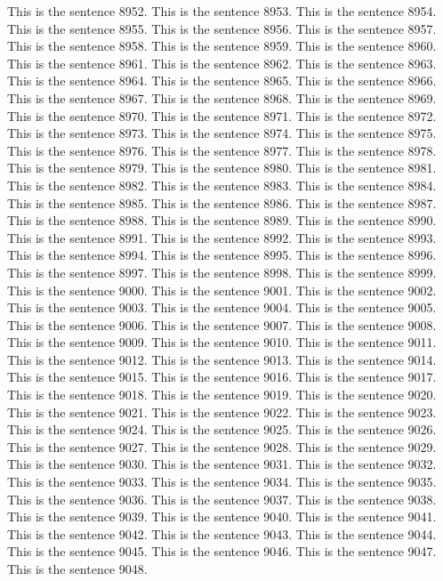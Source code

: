 \documentclass{article}
\begin{document}
This is the sentence 8952.
This is the sentence 8953.
This is the sentence 8954.
This is the sentence 8955.
This is the sentence 8956.
This is the sentence 8957.
This is the sentence 8958.
This is the sentence 8959.
This is the sentence 8960.
This is the sentence 8961.
This is the sentence 8962.
This is the sentence 8963.
This is the sentence 8964.
This is the sentence 8965.
This is the sentence 8966.
This is the sentence 8967.
This is the sentence 8968.
This is the sentence 8969.
This is the sentence 8970.
This is the sentence 8971.
This is the sentence 8972.
This is the sentence 8973.
This is the sentence 8974.
This is the sentence 8975.
This is the sentence 8976.
This is the sentence 8977.
This is the sentence 8978.
This is the sentence 8979.
This is the sentence 8980.
This is the sentence 8981.
This is the sentence 8982.
This is the sentence 8983.
This is the sentence 8984.
This is the sentence 8985.
This is the sentence 8986.
This is the sentence 8987.
This is the sentence 8988.
This is the sentence 8989.
This is the sentence 8990.
This is the sentence 8991.
This is the sentence 8992.
This is the sentence 8993.
This is the sentence 8994.
This is the sentence 8995.
This is the sentence 8996.
This is the sentence 8997.
This is the sentence 8998.
This is the sentence 8999.
This is the sentence 9000.
This is the sentence 9001.
This is the sentence 9002.
This is the sentence 9003.
This is the sentence 9004.
This is the sentence 9005.
This is the sentence 9006.
This is the sentence 9007.
This is the sentence 9008.
This is the sentence 9009.
This is the sentence 9010.
This is the sentence 9011.
This is the sentence 9012.
This is the sentence 9013.
This is the sentence 9014.
This is the sentence 9015.
This is the sentence 9016.
This is the sentence 9017.
This is the sentence 9018.
This is the sentence 9019.
This is the sentence 9020.
This is the sentence 9021.
This is the sentence 9022.
This is the sentence 9023.
This is the sentence 9024.
This is the sentence 9025.
This is the sentence 9026.
This is the sentence 9027.
This is the sentence 9028.
This is the sentence 9029.
This is the sentence 9030.
This is the sentence 9031.
This is the sentence 9032.
This is the sentence 9033.
This is the sentence 9034.
This is the sentence 9035.
This is the sentence 9036.
This is the sentence 9037.
This is the sentence 9038.
This is the sentence 9039.
This is the sentence 9040.
This is the sentence 9041.
This is the sentence 9042.
This is the sentence 9043.
This is the sentence 9044.
This is the sentence 9045.
This is the sentence 9046.
This is the sentence 9047.
This is the sentence 9048.
\end{document}

